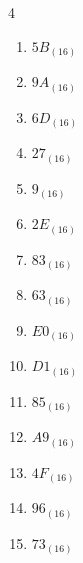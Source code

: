 \begin{multicols}{4}
\begin{enumerate}
        \phantom{$=115$}

  \item $5B_{(16)}$

        \phantom{$=91$}

  \item $9A_{(16)}$

        \phantom{$=154$}

  \item $6D_{(16)}$

        \phantom{$=109$}

  \item $27_{(16)}$

        \phantom{$=39$}

  \item $9_{(16)}$

        \phantom{$=9$}

  \item $2E_{(16)}$

        \phantom{$=46$}

  \item $83_{(16)}$

        \phantom{$=131$}

  \item $63_{(16)}$

        \phantom{$=99$}

  \item $E0_{(16)}$

        \phantom{$=224$}

  \item $D1_{(16)}$

        \phantom{$=209$}

  \item $85_{(16)}$

        \phantom{$=133$}

  \item $A9_{(16)}$

        \phantom{$=169$}

\columnbreak %

  \item $4F_{(16)}$

        \phantom{$=79$}

  \item $96_{(16)}$

        \phantom{$=150$}

  \item $73_{(16)}$

        \phantom{$=115$}


\end{enumerate}
\end{multicols}
